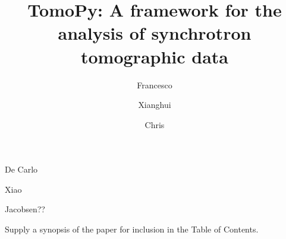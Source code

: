 \documentclass[pdf]{iucr}              %
\begin{document}



\title{TomoPy: A framework for the analysis of synchrotron tomographic data}


\author{Francesco}{De Carlo}
\author{Xianghui}{Xiao}
\author{Chris}{Jacobsen??}







\maketitle                        %

\begin{synopsis}
Supply a synopsis of the paper for inclusion in the Table of Contents.
\end{synopsis}
\end{document}
